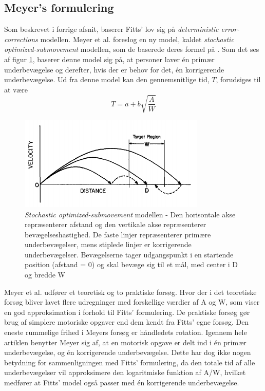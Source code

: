 \subsection*{Meyer's formulering}
Som beskrevet i forrige afsnit, baserer Fitts' lov sig på \emph{deterministic error-corrections} modellen. Meyer et al. foreslog en ny model, kaldet \textit{stochastic optimized-submovement} modellen, som de baserede deres formel på \cite{meyer1988}. Som det ses af figur \ref{fig:MeyerTheory}, baserer denne model sig på, at personer laver én primær underbevægelse og derefter, hvis der er behov for det, én korrigerende underbevægelse. Ud fra denne model kan den gennemsnitlige tid, $T$, forudsiges til at være
\begin{equation}
\label{eq:meyer}
T = a + b \sqrt{\frac{A}{W}}
\end{equation}

\begin{figure}[h]
\centering
\includegraphics[width=.5\linewidth]{images/illustrations/base_model_meyer}
\caption{\textit{Stochastic optimized-submovement} modellen - Den horisontale akse repræsenterer afstand og den vertikale akse repræsenterer bevægelseshastighed. De faste linjer repræsenterer primære underbevægelser, mens stiplede linjer er korrigerende underbevægelser. Bevægelserne tager udgangspunkt i en startende position (afstand = 0) og skal bevæge sig til et mål, med center i D og bredde W}
\label{fig:MeyerTheory}
\end{figure}

Meyer et al. udfører et teoretisk og to praktiske forsøg. Hvor der i det teoretiske forsøg bliver lavet flere udregninger med forskellige værdier af A og W, som viser en god approksimation i forhold til Fitts' formulering. De praktiske forsøg gør brug af simplere motoriske opgaver end dem kendt fra Fitts' egne forsøg. Den eneste rummelige frihed i Meyers forsøg er håndledets rotation. Igennem hele artiklen benytter Meyer sig af, at en motorisk opgave er delt ind i én primær underbevægelse, og én korrigerende underbevægelse. Dette har dog ikke nogen betydning for sammenligningen med Fitts’ formulering, da den totale tid af alle underbevægelser vil approksimere den logaritmiske funktion af A/W, hvilket medfører at Fitts' model også passer med én korrigerende underbevægelse.

